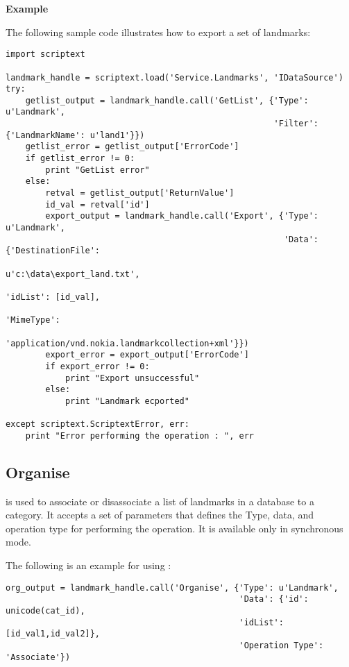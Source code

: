{\bf Example} \break

The following sample code illustrates how to export a set of landmarks:

\begin{verbatim}
import scriptext

landmark_handle = scriptext.load('Service.Landmarks', 'IDataSource')
try:
    getlist_output = landmark_handle.call('GetList', {'Type': u'Landmark', 
                                                      'Filter': {'LandmarkName': u'land1'}})
    getlist_error = getlist_output['ErrorCode']
    if getlist_error != 0:
        print "GetList error"
    else:
        retval = getlist_output['ReturnValue']
        id_val = retval['id']
        export_output = landmark_handle.call('Export', {'Type':  u'Landmark',
                                                        'Data': {'DestinationFile':
                                                                   u'c:\data\export_land.txt',
                                                                 'idList': [id_val],
                                                                 'MimeType': 
                                                                   'application/vnd.nokia.landmarkcollection+xml'}})
        export_error = export_output['ErrorCode']
        if export_error != 0:
            print "Export unsuccessful"
        else:
            print "Landmark ecported"

except scriptext.ScriptextError, err:
    print "Error performing the operation : ", err
\end{verbatim}

\subsection{Organise}
\label{subsec:landmarkorg}

 is used to associate or disassociate a list of landmarks in a database to a category. It accepts a set of parameters that defines the Type, data, and operation type for performing the operation. It is available only in synchronous mode.

The following is an example for using :

\begin{verbatim}
org_output = landmark_handle.call('Organise', {'Type': u'Landmark', 
                                               'Data': {'id': unicode(cat_id),
                                               'idList': [id_val1,id_val2]},
                                               'Operation Type': 'Associate'})
\end{verbatim}

